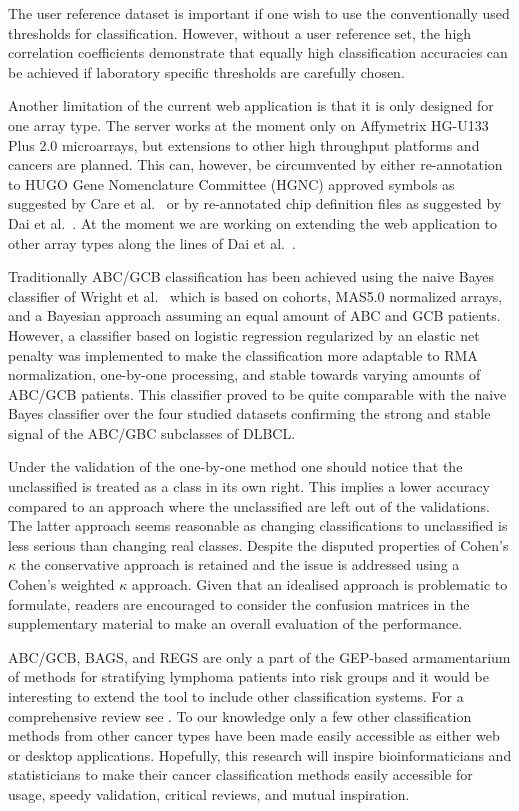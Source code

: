 \documentclass[twocolumn]{bmcart}%
\begin{document}
The user reference dataset is important if one wish to use the conventionally used thresholds for classification.
However, without a user reference set, the high correlation coefficients demonstrate that equally high classification accuracies can be achieved if laboratory specific thresholds are carefully chosen.

Another limitation of the current web application is that it is only designed for one array type.
The server works at the moment only on Affymetrix HG-U133 Plus 2.0 microarrays, but extensions to other high throughput platforms and cancers are planned.
This can, however, be circumvented by either re-annotation to HUGO Gene Nomenclature Committee (HGNC) approved symbols as suggested by Care et al.~\cite{Care2013} or by re-annotated chip definition files as suggested by Dai et al.~\cite{Dai2005}.
At the moment we are working on extending the web application to other array types along the lines of Dai et al.~\cite{Dai2005}.

Traditionally ABC/GCB classification has been achieved using the naive Bayes classifier of Wright et al.~\cite{Wright2003} which is based on cohorts, MAS5.0 normalized arrays, and a Bayesian approach assuming an equal amount of ABC and GCB patients.
However, a classifier based on logistic regression regularized by an elastic net penalty was implemented to make the classification more adaptable to RMA normalization, one-by-one processing, and stable towards varying amounts of ABC/GCB patients.
This classifier proved to be quite comparable with the naive Bayes classifier over the four studied datasets confirming the strong and stable signal of the ABC/GBC subclasses of DLBCL.

Under the validation of the one-by-one method one should notice that the unclassified is treated as a class in its own right.
This implies a lower accuracy compared to an approach where the unclassified are left out of the validations.
The latter approach seems reasonable as changing classifications to unclassified is less serious than changing real classes.
Despite the disputed properties of Cohen's $\kappa$ the conservative approach is retained and the issue is addressed using a Cohen's weighted $\kappa$ approach.
Given that an idealised approach is problematic to formulate, readers are encouraged to consider the confusion matrices in the supplementary material to make an overall evaluation of the performance.

ABC/GCB, BAGS, and REGS are only a part of the GEP-based armamentarium of methods for stratifying lymphoma patients into risk groups \cite{Shipp2002, Lossos2004a, Malumbres2008} and it would be interesting to extend the tool to include other classification systems.
For a comprehensive review see \cite{Coutinho2013}.
To our knowledge only a few other classification methods from other cancer types have been made easily accessible as either web or desktop applications.
Hopefully, this research will inspire bioinformaticians and statisticians to make their cancer classification methods easily accessible for usage, speedy validation, critical reviews, and mutual inspiration.
\end{document}
